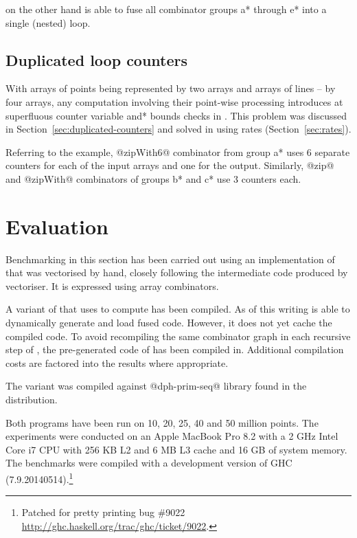 \documentclass[preamble.tex]{subfiles}
\begin{document}
\LiveFusion on the other hand is able to fuse all combinator groups \*a* through \*e* into a single (nested) loop.


\subsection{Duplicated loop counters}

With arrays of points being represented by two arrays and arrays of lines -- by four arrays, any computation involving their point-wise processing introduces at superfluous counter variable \*and* bounds checks in \StreamFusion. This problem was discussed in Section~\ref{sec:duplicated-counters} and solved in \LiveFusion using rates (Section~\ref{sec:rates}).

Referring to the \FilterMax example, @zipWith6@ combinator from group \*a* uses 6 separate counters for each of the input arrays and one for the output. Similarly, @zip@ and @zipWith@ combinators of groups \*b* and \*c* use 3 counters each.



\section{Evaluation}

Benchmarking in this section has been carried out using an implementation of \QuickHull that was vectorised by hand, closely following the intermediate  code produced by \DPH vectoriser. It is expressed using array combinators.

A variant of \QuickHull that uses \LiveFusion to compute \FilterMax has been compiled. As of this writing \LiveFusion is able to dynamically generate and load fused code. However, it does not yet cache the compiled code. To avoid recompiling the same combinator graph in each recursive step of \QuickHull, the pre-generated code of \FilterMax has been compiled in. Additional compilation costs are factored into the results where appropriate.

The \StreamFusion variant was compiled against @dph-prim-seq@ library found in the \DPH distribution.

Both programs have been run on 10, 20, 25, 40 and 50 million points. The experiments were conducted on an Apple MacBook Pro 8.2 with a 2 GHz Intel Core i7 CPU with 256 KB L2 and 6 MB L3 cache and 16 GB of system memory. The benchmarks were compiled with a development version of GHC (7.9.20140514).\footnote{Patched for  pretty printing bug \#9022 \url{http://ghc.haskell.org/trac/ghc/ticket/9022}.}
\end{document}

